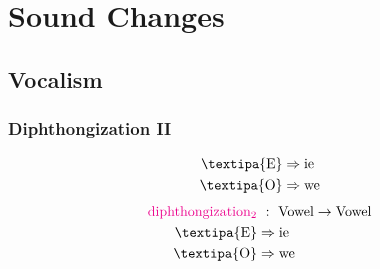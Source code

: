\documentclass{report}[12pt]
\begin{document}
\section{Sound Changes}

\subsection{Vocalism}

\subsubsection{Diphthongization II}\label{sec:diphthongization_2}

\begin{tcolorbox}
  \begin{align*}  
    \text{\textipa{E}} & \Rightarrow \text{ie} \\
    \text{\textipa{O}} & \Rightarrow \text{we} \\
  \end{align*}
  \tcblower  
  \begin{align*}
    \text{\textcolor{magenta}{diphthongization$_2$}} &\ :\ \text{Vowel} \rightarrow \text{Vowel} \\
    \text{\textipa{E}} & \Rightarrow \text{ie} \\
    \text{\textipa{O}} & \Rightarrow \text{we} \\
  \end{align*}
\end{tcolorbox}
\end{document}
